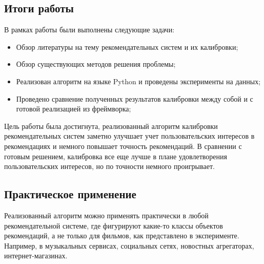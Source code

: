 \subsection*{Итоги работы}
В рамках работы были выполнены следующие задачи:
\begin{itemize}
    \item Обзор литературы на тему рекомендательных систем и их калибровки;
    \item Обзор существующих методов решения проблемы;
    \item Реализован алгоритм на языке Python и проведены эксперименты на данных;
    \item Проведено сравнение полученных результатов калибровки между собой и с готовой реализацией из фреймворка;
\end{itemize}

Цель работы была достигнута, реализованный алгоритм калибровки рекомендательных систем
заметно улучшает учет пользовательских интересов в рекомендациях и немного повышает точность рекомендаций.
В сравнении с готовым решением, калибровка все еще лучше в плане удовлетворения пользовательских интересов, 
но по точности немного проигрывает.

\subsection*{Практическое применение}
Реализованный алгоритм можно применять практически в любой рекомендательной системе, где фигурируют какие-то классы объектов рекомендаций, а не только для фильмов, как представлено в эксперименте.
Например, в музыкальных сервисах, социальных сетях, новостных агрегаторах, интернет-магазинах.